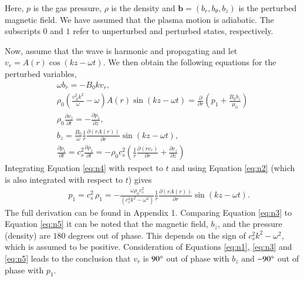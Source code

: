     Here, $p$ is the gas pressure, $\rho$ is the density and $\textbf{b} = (b_r,b_{\theta},b_z)$ is the perturbed magnetic field.
    We have assumed that the plasma motion is adiabatic.
    The subscripts $0$ and $1$ refer to unperturbed and perturbed states, respectively.
    
    Now, assume that the wave is harmonic and propagating and let $v_r=A(r)\cos(kz-\omega t)$.
    We then obtain the following equations for the perturbed variables,	
    \begin{align}
        &&\omega b_r=-B_0kv_r,\label{eq:n0}\\
        &&\rho_0\left(\frac{v_A^2k^2}{\omega}-\omega\right)A(r)\sin(kz-\omega t)=\frac{\partial}{\partial r}\left(p_1+\frac{B_0b_z}{\mu_0}\right)
        &&\label{eq:n1}\\
        &&\rho_0\frac{\partial v_z}{\partial t}=-\frac{\partial p_1}{\partial z},
        \label{eq:n2}\\
        && b_z=\frac{B_0}{\omega}\frac{1}{r}\frac{\partial (rA(r))}{\partial r}\sin(kz-\omega t),
        \label{eq:n3}\\
        &&\frac{\partial p_1}{\partial t}=c_s^2\frac{\partial\rho_1}{\partial t}=-\rho_0 c_s^2\left(\frac{1}{r}\frac{\partial(rv_r)}{\partial r}+\frac{\partial v_z}{\partial z}\right)
        \label{eq:n4}
    \end{align}
    Integrating Equation \ref{eq:n4} with respect to $t$ and using Equation \ref{eq:n2} (which is also integrated with respect to $t$) gives
    \begin{align}
        &&p_1=c_s^2\,\rho_1=-\frac{\omega\rho_0
            c_s^2}{(c_s^2k^2-\omega^2)}\frac{1}{r}\frac{\partial
            (rA(r))}{\partial r}\sin(kz-\omega t).
        \label{eq:n5}
    \end{align}
    The full derivation can be found in Appendix 1.
    Comparing Equation \ref{eq:n3} to Equation \ref{eq:n5} it can be noted that the magnetic field, $b_z$, and the pressure (density) are $180$ degrees out of phase.
    This depends on the sign of $c_s^2k^2-\omega^2$, which is assumed to be positive.
    Consideration of Equations \ref{eq:n1}, \ref{eq:n3} and \ref{eq:n5} leads to the conclusion that $v_r$ is $90\degree$ out of phase with $b_z$ and $-90\degree$ out of phase with $p_1$.
    
